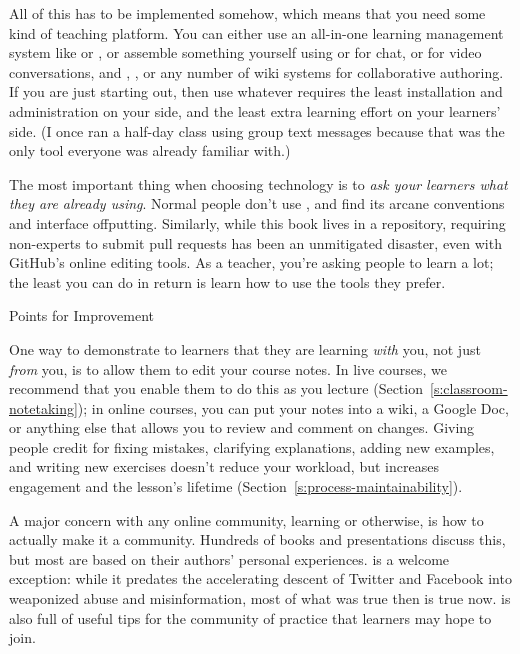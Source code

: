 All of this has to be implemented somehow, which means that you need
some kind of teaching platform. You can either use an all-in-one
learning management system like  or , or
assemble something yourself using  or  for
chat,  or  for
video conversations, and , , or any number of wiki systems for collaborative
authoring. If you are just starting out, then use whatever requires
the least installation and administration on your side, and the least
extra learning effort on your learners' side. (I once ran a half-day
class using group text messages because that was the only tool
everyone was already familiar with.)

The most important thing when choosing technology is to \emph{ask your
learners what they are already using}. Normal people don't use
, and find its arcane conventions and interface
offputting. Similarly, while this book lives in a 
repository, requiring non-experts to submit pull requests has been an
unmitigated disaster, even with GitHub's online editing tools. As a
teacher, you're asking people to learn a lot; the least you can do in
return is learn how to use the tools they prefer.

\begin{aside}{Points for Improvement}

One way to demonstrate to learners that they are learning \emph{with} you,
not just \emph{from} you, is to allow them to edit your course notes. In
live courses, we recommend that you enable them to do this as you
lecture (Section~\ref{s:classroom-notetaking}); in online courses, you
can put your notes into a wiki, a Google Doc, or anything else that
allows you to review and comment on changes. Giving people credit for
fixing mistakes, clarifying explanations, adding new examples, and
writing new exercises doesn't reduce your workload, but increases
engagement and the lesson's lifetime
(Section~\ref{s:process-maintainability}).

\end{aside}

A major concern with any online community, learning or otherwise, is how
to actually make it a community. Hundreds of books and presentations
discuss this, but most are based on their authors' personal experiences.
\cite{Krau2016} is a welcome exception: while it predates the
accelerating descent of Twitter and Facebook into weaponized abuse and
misinformation, most of what was true then is true now.
\cite{Foge2005} is also full of useful tips for the community of
practice that learners may hope to join.

